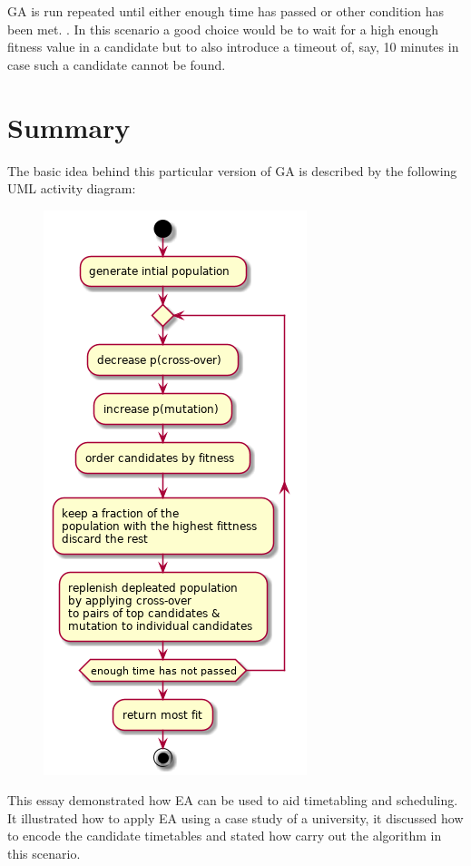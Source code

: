 \documentclass[a4paper, 12pt, titlepage]{article}
\begin{document}
GA is run repeated until either enough time has passed or other condition
has been met. \cite[p.~108]{eberhart2007}. In this scenario a good choice
would be to wait for a high enough fitness value in a candidate but to
also introduce a timeout of, say, 10 minutes in case such a candidate
cannot be found.

\section*{Summary}

The basic idea behind this particular version of GA is described by the
following UML activity diagram: 

\begin{figure}[h]
    \includegraphics[scale=0.6]{algo.png}
    \centering
\end{figure}

This essay demonstrated how EA can be used to aid timetabling and
scheduling. It illustrated how to apply EA using a case study of a
university, it discussed how to encode the candidate timetables and
stated how carry out the algorithm in this scenario.
\end{document}
